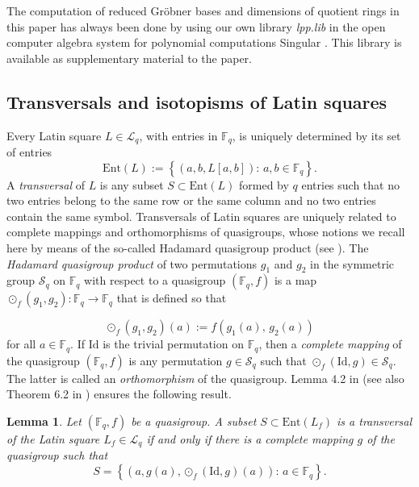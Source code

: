 \documentclass[pdflatex,sn-mathphys-num]{sn-jnl}
\theoremstyle{thmstyleone}%
\newtheorem{lemma}{Lemma}[section]
\begin{document}
The computation of reduced Gr\"obner bases and dimensions of quotient rings in this paper has always been done by using our own library {\em lpp.lib} in the open computer algebra system for polynomial computations {\sc Singular} \cite{Decker2025}. This library is available as supplementary material to the paper.

\subsection{Transversals and isotopisms of Latin squares}

Every Latin square $L\in\mathcal{L}_q$, with entries in $\mathbb{F}_q$, is uniquely determined by its set of entries
\[\mathrm{Ent}(L):=\left\{\left(a,b,L[a,b]\right)\colon\,a,b\in\mathbb{F}_q\right\}.\]
A {\em transversal} of $L$ is any subset $S\subset\mathrm{Ent}(L)$ formed by $q$ entries such that no two entries belong to the same row or the same column and no two entries contain the same symbol. Transversals of Latin squares are uniquely related to complete mappings and orthomorphisms of quasigroups, whose notions we recall here by means of the so-called Hadamard quasigroup product (see \cite{Falcon2023, Falcon2025}). The {\em Hadamard quasigroup product} of two permutations $g_1$ and $g_2$ in the symmetric group $\mathcal{S}_q$ on $\mathbb{F}_q$ with respect to a quasigroup $(\mathbb{F}_q,f)$ is a map $\odot_f(g_1,g_2):\mathbb{F}_q\to \mathbb{F}_q$ that is defined so that

\begin{equation}\label{eq_hqp_multiary}
\odot_f(g_1,g_2)(a):=f(g_1(a),\,g_2(a))
\end{equation}
for all $a\in\mathbb{F}_q$. If $\mathrm{Id}$ is the trivial permutation on $\mathbb{F}_q$, then a {\em complete mapping} of the quasigroup $(\mathbb{F}_q,f)$ is any permutation $g\in\mathcal{S}_q$ such that $\odot_f(\mathrm{Id},g)\in\mathcal{S}_q$. The latter is called an {\em orthomorphism} of the quasigroup. Lemma 4.2 in \cite{Falcon2025}  (see also Theorem 6.2 in \cite{Wanless2011}) ensures the following result.

\begin{lemma}\label{lemma_transversals} Let $(\mathbb{F}_q,f)$ be a quasigroup. A subset $S\subset \mathrm{Ent}(L_f)$ is a transversal of the Latin square $L_f\in\mathcal{L}_q$ if and only if there is a complete mapping $g$ of the quasigroup such that 
\[S=\left\{(a,g(a),\odot_f(\mathrm{Id}
,g)(a))\colon\, a\in \mathbb{F}_q \right\}.\]
\end{lemma}
\end{document}
